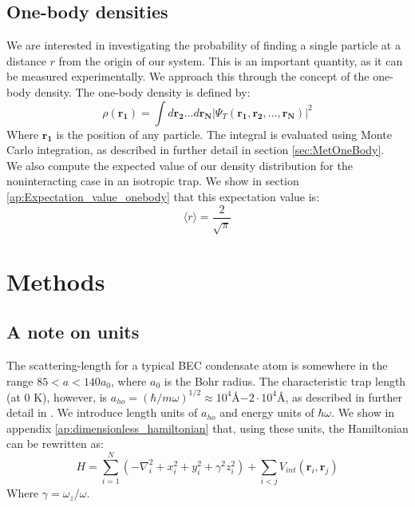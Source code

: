 \documentclass[a4paper, 10pt]{article}
\begin{document}
	\subsection{One-body densities}
	We are interested in investigating the probability of finding a single particle at a distance $r$ from the origin of our system. This is an important quantity, as it can be measured experimentally. We approach this through the concept of the one-body density. The one-body density is defined by:
	\begin{equation}\label{eq:OneBodyDensity}
	\rho(\boldsymbol{r_1})=\int d\boldsymbol{r_2}...d\boldsymbol{r_N}|\Psi_T(\boldsymbol{r_1},\boldsymbol{r_2},...,\boldsymbol{r_N})|^2
	\end{equation}
	Where $\boldsymbol{r_1}$ is the position of any particle. The integral is evaluated using Monte Carlo integration, as described in further detail in section \ref{sec:MetOneBody}.\\
	\linebreak
	We also compute the expected value of our density distribution for the noninteracting case in an isotropic trap. We show in section \ref{ap:Expectation_value_onebody} that this expectation value is:
	\begin{equation}\label{eq:expectation_value_onebody}
	\langle r \rangle =\frac{2}{\sqrt{\pi}}
	\end{equation}
	\section{Methods}\label{Method_section}
	\subsection{A note on units}\label{sec:UNITS}
	The scattering-length for a typical BEC condensate atom is somewhere in the range $85<a<140a_0$, where $a_0$ is the Bohr radius. The characteristic trap length (at 0 K), however, is $a_{ho}=(\hbar/m\omega)^{1/2}\approx 10^{4}$Å$-2\cdot 10^{4}$Å, as described in further detail in \cite{DuBois2001}. We introduce length units of $a_{ho}$ and energy units of $\hbar \omega$. We show in appendix \ref{ap:dimensionless_hamiltonian} that, using these units, the Hamiltonian can be rewritten as:
	\begin{equation}\label{eq:Hamiltonian_dimensionless}
	H=\sum_{i=1}^N\left(-\nabla_i^2 + x_i^2+y_i^2+\gamma^2 z_i^2\right)+\sum_{i<j}V_{int}(\boldsymbol{r}_i, \boldsymbol{r}_j)
	\end{equation}
	Where $\gamma=\omega_z/\omega$.
\end{document}
